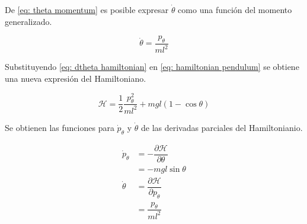 De \eqref{eq: theta momentum} es posible expresar $\dot \theta$ como una función del momento generalizado.

\begin{equation}
 \dot \theta = \dfrac{p_{\theta}}{m l^2}
 \label{eq: dtheta hamiltonian}
\end{equation}

Substituyendo \eqref{eq: dtheta hamiltonian} en 
\eqref{eq: hamiltonian pendulum} se obtiene una nueva 
expresión del Hamiltoniano.

\begin{equation}
 \mathcal H = \dfrac{1}{2} \dfrac{p_{\theta}^2}{m l^2}  + m g l (1 - \cos{\theta})
 \label{eq: ptheta hamiltonian}
\end{equation}

Se obtienen las funciones para $\dot p_{\theta}$ y 
$\dot \theta$ de las derivadas parciales del Hamiltonianio.

\begin{subequations}
 \begin{align}
  \dot p_{\theta} &= - \dfrac{\partial \mathcal H}{\partial \theta}\\
  &= -mgl \sin \theta \\
  \dot \theta &= \dfrac{\partial \mathcal H}{\partial p_{\theta}}\\
  &= \dfrac{p_{\theta}}{ml^2}
 \end{align}

\end{subequations}
